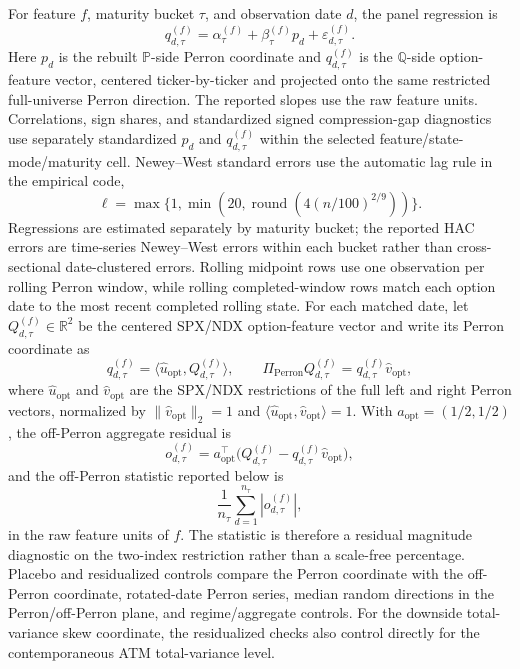 \documentclass[11pt,a4paper]{amsart}
\theoremstyle{plain}
\theoremstyle{definition}
\theoremstyle{remark}
\newcommand{\R}{\mathbb{R}}
\newcommand{\PP}{\mathbb{P}}
\newcommand{\QQ}{\mathbb{Q}}
\begin{document}
For feature \(f\), maturity bucket \(\tau\), and observation date \(d\), the panel
regression is
\[
        q_{d,\tau}^{(f)}
        =
        \alpha_{\tau}^{(f)}
        +
        \beta_{\tau}^{(f)}p_d
        +
        \varepsilon_{d,\tau}^{(f)}.
\]
Here \(p_d\) is the rebuilt \(\PP\)-side Perron coordinate and \(q_{d,\tau}^{(f)}\) is the
\(\QQ\)-side option-feature vector, centered ticker-by-ticker and projected onto the same
restricted full-universe Perron direction.  The reported slopes use the raw feature units.
Correlations, sign shares, and standardized signed compression-gap
diagnostics use separately standardized \(p_d\) and \(q_{d,\tau}^{(f)}\) within the selected
feature/state-mode/maturity cell.  Newey--West standard errors use the automatic lag rule in the
empirical code,
\[
        \ell=\max\{1,\min(20,\operatorname{round}(4(n/100)^{2/9}))\}.
\]
Regressions are estimated separately by maturity bucket; the reported HAC errors are time-series
Newey--West errors within each bucket rather than cross-sectional date-clustered errors.  Rolling
midpoint rows use one observation per rolling Perron window, while rolling completed-window rows
match each option date to the most recent completed rolling state.  For each matched date, let
\(Q_{d,\tau}^{(f)}\in\R^2\) be the centered SPX/NDX option-feature vector and write its Perron
coordinate as
\[
        q_{d,\tau}^{(f)}
        =
        \langle \widehat u_{\mathrm{opt}},Q_{d,\tau}^{(f)}\rangle,
        \qquad
        \Pi_{\mathrm{Perron}}Q_{d,\tau}^{(f)}
        =
        q_{d,\tau}^{(f)}\widehat v_{\mathrm{opt}},
\]
where \(\widehat u_{\mathrm{opt}}\) and \(\widehat v_{\mathrm{opt}}\) are the SPX/NDX restrictions
of the full left and right Perron vectors, normalized by
\(\|\widehat v_{\mathrm{opt}}\|_2=1\) and
\(\langle \widehat u_{\mathrm{opt}},\widehat v_{\mathrm{opt}}\rangle=1\).  With
\(a_{\mathrm{opt}}=(1/2,1/2)\), the off-Perron aggregate residual is
\[
        o_{d,\tau}^{(f)}
        =
        a_{\mathrm{opt}}^\top
        \bigl(Q_{d,\tau}^{(f)}-q_{d,\tau}^{(f)}\widehat v_{\mathrm{opt}}\bigr),
\]
and the off-Perron statistic reported below is
\[
        \frac{1}{n_\tau}\sum_{d=1}^{n_\tau}|o_{d,\tau}^{(f)}|,
\]
in the raw feature units of \(f\).  The statistic is therefore a residual magnitude diagnostic on
the two-index restriction rather than a scale-free percentage.  Placebo and residualized controls
compare the Perron coordinate with the off-Perron coordinate, rotated-date Perron series, median
random directions in the Perron/off-Perron plane, and regime/aggregate controls.  For the
downside total-variance skew coordinate, the residualized checks also control directly for the
contemporaneous ATM total-variance level.
\end{document}
